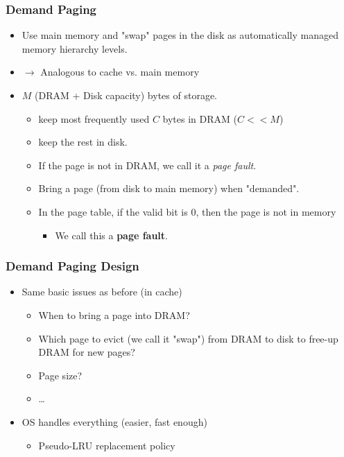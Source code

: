 \documentclass[10pt]{article}
\begin{document}
\subsubsection*{Demand Paging}
\begin{itemize}
    \item Use main memory and "swap" pages in the disk as automatically managed memory hierarchy levels.
    \item $\rightarrow$ Analogous to cache vs. main memory
    \item $M$ (DRAM + Disk capacity) bytes of storage.
    \begin{itemize}
        \item keep most frequently used $C$ bytes in DRAM ($C << M$)
        \item keep the rest in disk.
        \item If the page is not in DRAM, we call it a \textit{page fault}.
        \item Bring a page (from disk to main memory) when "demanded".
        \item In the page table, if the valid bit is 0, then the page is not in memory
        \begin{itemize}
            \item We call this a \textbf{page fault}.
        \end{itemize}
    \end{itemize}
\end{itemize}
\subsubsection*{Demand Paging Design}
\begin{itemize}
    \item Same basic issues as before (in cache)
    \begin{itemize}
        \item When to bring a page into DRAM?
        \item Which page to evict (we call it "swap") from DRAM to disk to free-up DRAM for new pages?
        \item Page size?
        \item \dots
    \end{itemize}
    \item OS handles everything (easier, fast enough)
    \begin{itemize}
        \item Pseudo-LRU replacement policy
    \end{itemize}
\end{itemize}
\end{document}
